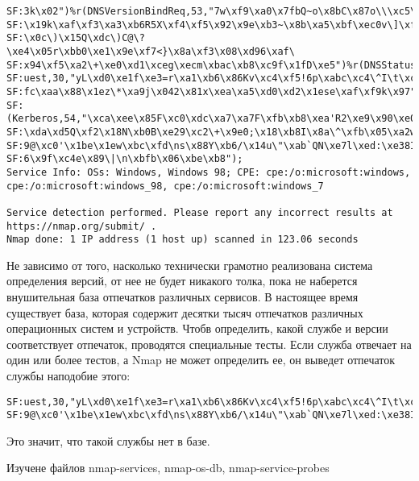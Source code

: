 \documentclass[12pt,a4paper]{report}
\begin{document}
\begin{verbatim}
SF:3k\x02")%r(DNSVersionBindReq,53,"7w\xf9\xa0\x7fbQ~o\x8bC\x87o\\\xc5\xfd
SF:\x19k\xaf\xf3\xa3\xb6R5X\xf4\xf5\x92\x9e\xb3~\x8b\xa5\xbf\xec0v\]\xf2\$
SF:\x0c\)\x15Q\xdc\)C@\?\xe4\x05r\xbb0\xe1\x9e\xf7<}\x8a\xf3\x08\xd96\xaf\
SF:x94\xf5\xa2\+\xe0\xd1\xceg\xecm\xbac\xb8\xc9f\x1fD\xe5")%r(DNSStatusReq
SF:uest,30,"yL\xd0\xe1f\xe3=r\xa1\xb6\x86Kv\xc4\xf5!6p\xabc\xc4\^I\t\xca\x
SF:fc\xaa\x88\x1ez\*\xa9j\x042\x81x\xea\xa5\xd0\xd2\x1ese\xaf\xf9k\x97")%r
SF:(Kerberos,54,"\xca\xee\x85F\xc0\xdc\xa7\xa7F\xfb\xb8\xea'R2\xe9\x90\xe0
SF:\xda\xd5Q\xf2\x18N\xb0B\xe29\xc2\+\x9e0;\x18\xb8I\x8a\^\xfb\x05\xa2w\xb
SF:9@\xc0'\x1be\x1ew\xbc\xfd\ns\x88Y\xb6/\x14u\"\xab`QN\xe7l\xed:\xe38I\xe
SF:6\x9f\xc4e\x89\|\n\xbfb\x06\xbe\xb8");
Service Info: OSs: Windows, Windows 98; CPE: cpe:/o:microsoft:windows, cpe:/o:microsoft:windows_98, cpe:/o:microsoft:windows_7

Service detection performed. Please report any incorrect results at https://nmap.org/submit/ .
Nmap done: 1 IP address (1 host up) scanned in 123.06 seconds
\end{verbatim}

Не зависимо от того, насколько технически грамотно реализована система определения версий, от нее не будет никакого толка, пока не наберется внушительная база отпечатков различных сервисов. В настоящее время существует база, которая содержит десятки тысяч отпечатков различных операционных систем и устройств. Чтобв определить, какой службе и версии соответствует отпечаток, проводятся специальные тесты.
Если служба отвечает на один или более тестов, а Nmap не может определить ее, он выведет отпечаток службы наподобие этого:
\begin{verbatim}
SF:uest,30,"yL\xd0\xe1f\xe3=r\xa1\xb6\x86Kv\xc4\xf5!6p\xabc\xc4\^I\t\xca\x
SF:9@\xc0'\x1be\x1ew\xbc\xfd\ns\x88Y\xb6/\x14u\"\xab`QN\xe7l\xed:\xe38I\xe
\end{verbatim}
Это значит, что такой службы нет в базе.




Изучене файлов nmap-services, nmap-os-db, nmap-service-probes
\end{document}
